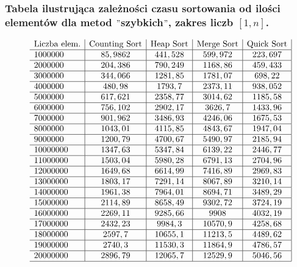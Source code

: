 \documentclass[polish,polish,a4paper]{article}
\begin{document}
\begin{spacing}{1.5}
	\subsubsection*{Tabela ilustrująca zależności czasu sortowania od ilości elementów dla metod $"$szybkich$"$, zakres liczb $ [1,n] $.}

\begin{figure}[H]
	\begin{equation*}
	\begin{array}{l|c|c|c|c|}
	
	$Liczba elem.$&$Counting Sort$&$Heap Sort$&$Merge Sort$&$Quick Sort$\\\hline
	1000000&	85,9862& 441,528& 599,972&	223,697\\\hline
	2000000& 204,386&	790,249&	1168,86&	459,433\\\hline
	3000000&	344,066&	1281,85&	1781,07&	698,22\\\hline
	4000000& 480,98&	1793,7&	2373,11&	938,052\\\hline
	5000000& 617,621&	2358,77&	3014,62&	1185,58\\\hline
	6000000& 756,102&	2902,17&	3626,7&	1433,96\\\hline
	7000000& 901,962&	3486,93&	4246,06&	1675,53\\\hline
	8000000& 1043,01&	4115,85&	4843,67&	1947,04\\\hline
	9000000& 1200,79&	4700,67&	5490,97&	2185,94\\\hline
	10000000& 	1347,63&	5347,84&	6139,22&	2446,77\\\hline
	11000000& 	1503,04&	5980,28&	6791,13&	2704,96\\\hline
	12000000& 	1649,68&	6614,99&	7416,89&	2969,83\\\hline
	13000000& 	1803,17&	7291,14&	8067,89&	3210,14\\\hline
	14000000& 	1961,38&	7964,01&	8694,71&	3489,29\\\hline
	15000000& 	2114,89&	8658,49&	9302,72&	3724,19\\\hline
	16000000& 	2269,11&	9285,66&	9908&	4032,19\\\hline
	17000000& 	2432,23&	9984,3&	10570,9&	4258,68\\\hline
	18000000& 	2597,7&	10655,1&	11213,5&	4489,62\\\hline
	19000000& 	2740,3&	11530,3&	11864,9&	4786,57\\\hline
	20000000& 	2896,79&	12065,7&	12529,9&	5046,56\\
	\hline

	\end{array}
	\end{equation*}
\end{figure}


\end{spacing}
\end{document}
